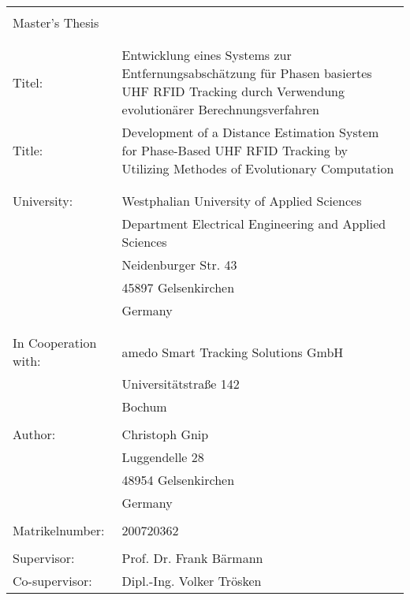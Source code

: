 \begin{longtable}{p{4cm}p{95mm}}
{} & {}\\
\Large{Master's Thesis} & {}\\
{} & {}\\
{} & {}\\
Titel: & Entwicklung eines Systems zur
Entfernungsabschätzung für Phasen basiertes UHF RFID Tracking durch Verwendung
evolutionärer Berechnungsverfahren\\
Title: & Development of a Distance Estimation System for
Phase-Based UHF RFID Tracking by Utilizing Methodes of Evolutionary Computation\\
{} & {}\\
{} & {}\\
University:                 & Westphalian University of Applied Sciences \\
{} & Department Electrical Engineering and Applied Sciences \\
{}                          & Neidenburger Str. 43 \\
{}                          & 45897 Gelsenkirchen \\
{}                          & Germany \\
{}                          & {}\\
{}                          & {}\\
In Cooperation with:        & amedo Smart Tracking Solutions GmbH\\
{}                          & Universitätstraße 142 \\
{}                          & Bochum \\
{}                          & {}\\
Author:                     & Christoph Gnip \\
{}                          & Luggendelle 28 \\
{}                          & 48954 Gelsenkirchen \\
{}                          & Germany \\
{}                          & {}\\
Matrikelnumber:				& 200720362 \\
{}                          & {}\\
Supervisor:                 & Prof. Dr. Frank Bärmann \\
Co-supervisor:              & Dipl.-Ing. Volker Trösken\\
\end{longtable}

\newpage